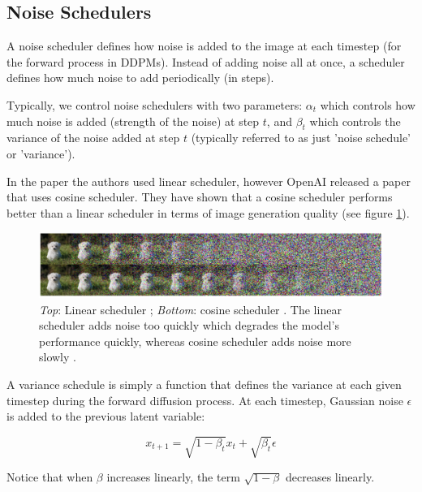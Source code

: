 





\subsection{Noise Schedulers}

A noise scheduler defines how noise is added to the image at each timestep (for the forward process in DDPMs). Instead of adding noise all at once, a scheduler defines how much noise to add periodically (in steps).

Typically, we control noise schedulers with two parameters: $\alpha_t$ which controls how much noise is added (strength of the noise) at step $t$, and $\beta_t$ which controls the variance  of the noise added at step $t$ (typically referred to as just 'noise schedule' or 'variance').

In the paper \cite{ddpm} the authors used linear scheduler, however OpenAI released a paper \cite{openai_improved_ddpm} that uses cosine scheduler. They have shown that a cosine scheduler performs better than a linear scheduler in terms of image generation quality (see figure \ref{fig:linear_cosine_scheduler}).

\begin{figure}
    \centering
    \includegraphics[width=1\textwidth]{images/diffusion_models/linear_cosine_scheduler.png}
    \caption{\textit{Top}: Linear scheduler \cite{ddpm}; \textit{Bottom}: cosine scheduler \cite{openai_improved_ddpm}. The linear scheduler adds noise too quickly which degrades the model's performance quickly, whereas cosine scheduler adds noise more slowly \cite{openai_improved_ddpm}.}
    \label{fig:linear_cosine_scheduler}
\end{figure}

A variance schedule is simply a function that defines the variance at each given timestep during the forward diffusion process. At each timestep, Gaussian noise $\epsilon$ is added to the previous latent variable:

\[
    x_{t+1} = \sqrt{1 - \beta_t} x_t + \sqrt{\beta_t} \epsilon
\]

Notice that when $\beta$ increases linearly, the term $\sqrt{1-\beta}$ decreases linearly. 


